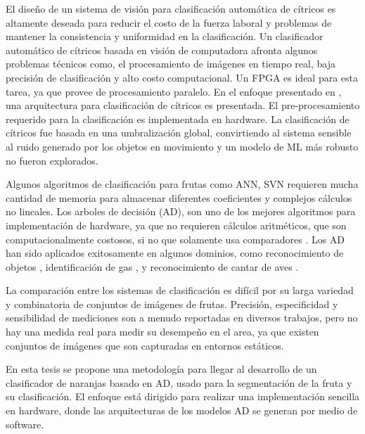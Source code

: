 \documentclass[twoside,spanish,ESP,MSc]{plantillaLabUPV}
\theoremstyle{definition}
\begin{document}

El diseño de un sistema de visión para clasificación automática de cítricos es altamente deseada para reducir el costo de la fuerza laboral y problemas de mantener la consistencia y uniformidad en la clasificación. Un clasificador automático de cítricos basada en visión de computadora afronta algunos problemas técnicos como, el procesamiento de imágenes en tiempo real, baja precisión de clasificación y alto costo computacional. Un FPGA es ideal para esta tarea, ya que provee de procesamiento paralelo.  En el enfoque presentado en \cite{josu}, una arquitectura para clasificación de cítricos es presentada. El pre-procesamiento requerido para la clasificación es implementada en hardware. La clasificación de cítricos fue basada en una umbralización global, convirtiendo al sistema sensible al ruido generado por los objetos en movimiento y un modelo de ML más robusto no fueron explorados.



Algunos algoritmos de clasificación para frutas como ANN, SVN requieren mucha cantidad de memoria para almacenar diferentes coeficientes y complejos cálculos no lineales. Los arboles de decisión (AD), son uno de los mejores algoritmos para implementación de hardware, ya que no requieren cálculos aritméticos, que son computacionalmente costosos, si no que solamente usa comparadores \cite{6636881}. Los AD han sido aplicados exitosamente en algunos dominios, como reconocimiento de objetos \cite{10.1007/978-3-540-32256-6_52}, identificación de gas \cite{li}, y reconocimiento de cantar de aves \cite{5986215}.



La comparación entre los sistemas de clasificación es difícil por su larga variedad y combinatoria de conjuntos de imágenes de frutas. Precisión, especificidad y sensibilidad de mediciones son a menudo reportadas en diversos trabajos, pero no hay una medida real para medir su desempeño en el area, ya que existen conjuntos de imágenes que son capturadas en entornos estáticos.

En esta tesis se propone una metodología para llegar al desarrollo de un clasificador de naranjas basado en AD, usado para la segmentación de la fruta y su clasificación. El enfoque está dirigido para realizar una implementación sencilla en hardware, donde las arquitecturas de los modelos AD se generan por medio de software.
\end{document}
